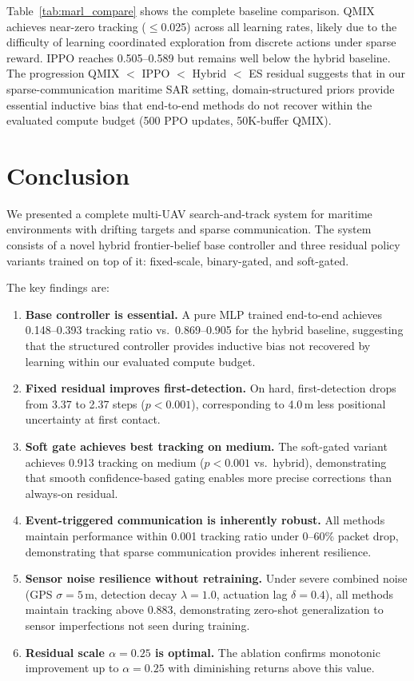 \documentclass[journal]{IEEEtran}
\begin{document}
Table~\ref{tab:marl_compare} shows the complete baseline comparison. QMIX achieves
near-zero tracking ($\leq$0.025) across all learning rates, likely due to the
difficulty of learning coordinated exploration from discrete actions under sparse
reward. IPPO reaches 0.505--0.589 but remains well below the hybrid baseline.
The progression QMIX $<$ IPPO $<$ Hybrid $<$ ES residual suggests that in our
sparse-communication maritime SAR setting, domain-structured priors provide
essential inductive bias that end-to-end methods do not recover within the
evaluated compute budget (500 PPO updates, 50K-buffer QMIX).

\section{Conclusion}
\label{sec:conclusion}

We presented a complete multi-UAV search-and-track system for maritime environments
with drifting targets and sparse communication. The system consists of a novel hybrid
frontier-belief base controller and three residual policy variants trained on top of
it: fixed-scale, binary-gated, and soft-gated.

The key findings are:
\begin{enumerate}
  \item \textbf{Base controller is essential.} A pure MLP trained end-to-end achieves
        0.148--0.393 tracking ratio vs.\ 0.869--0.905 for the hybrid baseline,
        suggesting that the structured controller provides inductive bias not
        recovered by learning within our evaluated compute budget.
  \item \textbf{Fixed residual improves first-detection.} On hard, first-detection
        drops from 3.37 to 2.37 steps ($p < 0.001$), corresponding to 4.0\,m less
        positional uncertainty at first contact.
  \item \textbf{Soft gate achieves best tracking on medium.} The soft-gated variant
        achieves 0.913 tracking on medium ($p < 0.001$ vs.\ hybrid), demonstrating
        that smooth confidence-based gating enables more precise corrections than
        always-on residual.
  \item \textbf{Event-triggered communication is inherently robust.} All methods
        maintain performance within 0.001 tracking ratio under 0--60\% packet drop,
        demonstrating that sparse communication provides inherent resilience.
  \item \textbf{Sensor noise resilience without retraining.} Under severe combined
        noise (GPS $\sigma{=}5$\,m, detection decay $\lambda{=}1.0$, actuation lag
        $\delta{=}0.4$), all methods maintain tracking above 0.883, demonstrating
        zero-shot generalization to sensor imperfections not seen during training.
  \item \textbf{Residual scale $\alpha = 0.25$ is optimal.} The ablation confirms
        monotonic improvement up to $\alpha = 0.25$ with diminishing returns above
        this value.
\end{enumerate}
\end{document}
